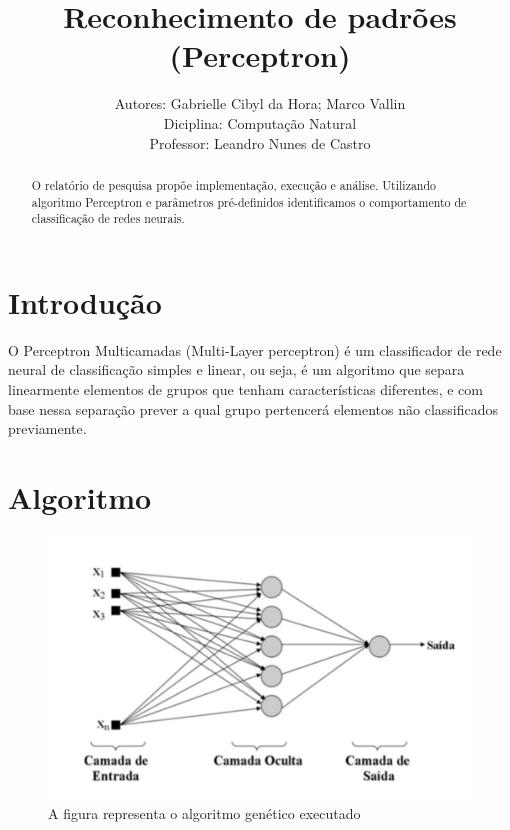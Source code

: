 \documentclass[runningheads]{llncs}
\begin{document}
%
\title{Reconhecimento de padrões (Perceptron)}
%
%
\pagestyle{plain}
\author{Autores: Gabrielle Cibyl da Hora; Marco Vallin \\ 
Diciplina: Computação Natural \\
Professor: Leandro Nunes de Castro} 
%
%
%
\maketitle              %
%
\begin{abstract}
O relatório de pesquisa propõe implementação, execução e análise. Utilizando algoritmo Perceptron e parâmetros pré-definidos identificamos o comportamento de classificação de redes neurais.

\end{abstract}
%
%
\section{Introdução}

O Perceptron Multicamadas (Multi-Layer perceptron) é um classificador de rede neural de classificação simples e linear, ou seja, é um algoritmo que separa linearmente elementos de grupos que tenham características diferentes, e com base nessa separação prever a qual grupo pertencerá elementos não classificados previamente.

\section{Algoritmo}

\begin{figure}
\begin{center}
\includegraphics[scale=0.30]{fluxograma.jpg}
\end{center}
\caption{A figura representa o algoritmo genético executado} \label{fig1}
\end{figure}
\end{document}
